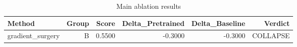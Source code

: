 \begin{table}[htbp]
\centering
\caption{Main ablation results}
\label{tab:main-results}
\begin{tabular}{lrrrrr}
\toprule
\textbf{Method} & \textbf{Group} & \textbf{Score} & \textbf{Delta\_Pretrained} & \textbf{Delta\_Baseline} & \textbf{Verdict} \\
\midrule
gradient\_surgery & B & 0.5500 & -0.3000 & -0.3000 & COLLAPSE \\
\bottomrule
\end{tabular}
\end{table}